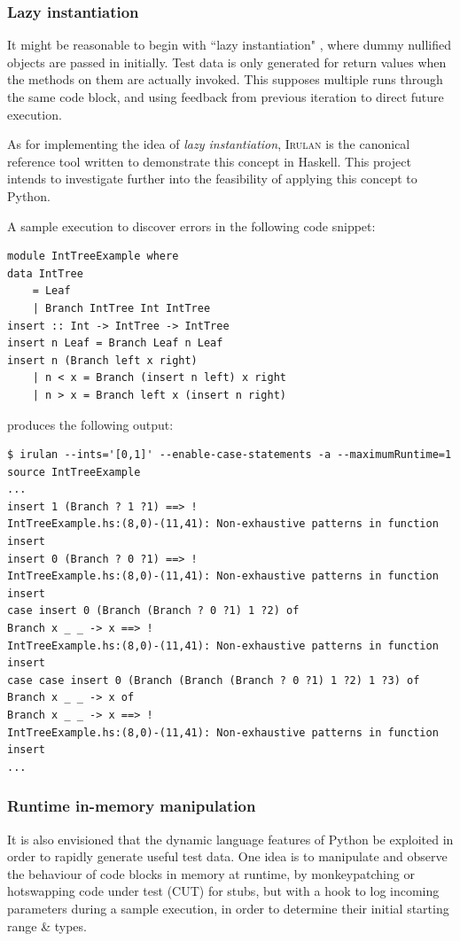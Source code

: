 \documentclass{icldt}
\numberwithin{equation}{section}       %
\begin{document}
{\subsubsection{Lazy instantiation}
It might be reasonable to begin with ``lazy instantiation" \cite{Allwood2011}, where dummy \textsf{null}ified objects are passed in initially. Test data is only generated for return values when the methods on them are actually invoked. This supposes multiple runs through the same code block, and using feedback from previous iteration to direct future execution.

As for implementing the idea of \emph{lazy instantiation}, \textsc{Irulan} \cite{Allwood2011} is the canonical reference tool written to demonstrate this concept in Haskell. This project intends to investigate further into the feasibility of applying this concept to Python.

A sample execution to discover errors in the following code snippet:

\begin{lstlisting}[language=HaskellUlisses,frame=single]
module IntTreeExample where
data IntTree
	= Leaf
	| Branch IntTree Int IntTree
insert :: Int -> IntTree -> IntTree
insert n Leaf = Branch Leaf n Leaf
insert n (Branch left x right)
	| n < x = Branch (insert n left) x right
	| n > x = Branch left x (insert n right)
\end{lstlisting}
\clearpage
produces the following output:
\begin{lstlisting}[language=HaskellUlisses,frame=single]
$ irulan --ints='[0,1]' --enable-case-statements -a --maximumRuntime=1 source IntTreeExample
...
insert 1 (Branch ? 1 ?1) ==> !
IntTreeExample.hs:(8,0)-(11,41): Non-exhaustive patterns in function insert
insert 0 (Branch ? 0 ?1) ==> !
IntTreeExample.hs:(8,0)-(11,41): Non-exhaustive patterns in function insert
case insert 0 (Branch (Branch ? 0 ?1) 1 ?2) of
Branch x _ _ -> x ==> !
IntTreeExample.hs:(8,0)-(11,41): Non-exhaustive patterns in function insert
case case insert 0 (Branch (Branch (Branch ? 0 ?1) 1 ?2) 1 ?3) of
Branch x _ _ -> x of
Branch x _ _ -> x ==> !
IntTreeExample.hs:(8,0)-(11,41): Non-exhaustive patterns in function insert
...
\end{lstlisting}

\subsubsection{Runtime in-memory manipulation}
It is also envisioned that the dynamic language features of Python be exploited in order to rapidly generate useful test data. One idea is to manipulate and observe the behaviour of code blocks in memory at runtime, by monkeypatching or hotswapping code under test (CUT) for stubs, but with a hook to log incoming parameters during a sample execution, in order to determine their initial starting range \& types.

}
\end{document}
